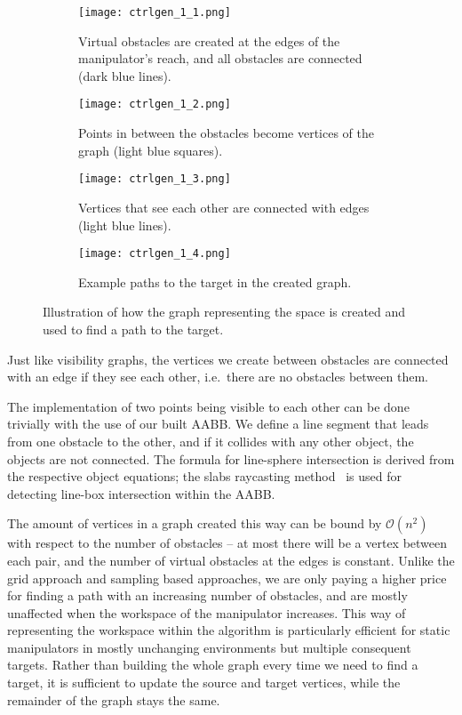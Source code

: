 \begin{figure}
    \centering
    \begin{subfigure}{.45\textwidth}
      \texttt{[image: ctrlgen\_1\_1.png]}
      \caption{Virtual obstacles are created at the edges of the manipulator's reach, and all obstacles are connected (dark blue lines).}
    \end{subfigure}
    \begin{subfigure}{0.45\textwidth}
      \texttt{[image: ctrlgen\_1\_2.png]}
      \caption{Points in between the obstacles become vertices of the graph (light blue squares).}
    \end{subfigure}

    \begin{subfigure}{.45\textwidth}
      \texttt{[image: ctrlgen\_1\_3.png]}
      \caption{Vertices that see each other are connected with edges (light blue lines).}
    \end{subfigure}
    \begin{subfigure}{0.45\textwidth}
      \texttt{[image: ctrlgen\_1\_4.png]}
      \caption{Example paths to the target in the created graph.}
    \end{subfigure}
    \caption{Illustration of how the graph representing the space is created and used to find a path to the target.}\label{fig:ctrlgen}
  \end{figure}

Just like visibility graphs, the vertices we create between obstacles are connected with an edge if they see each other, i.e.\ there are no obstacles between them.

The implementation of two points being visible to each other can be done trivially with the use of our built AABB. We define a line segment that leads from one obstacle to the other, and if it collides with any other object, the objects are not connected. The formula for line-sphere intersection is derived from the respective object equations; the slabs raycasting method~\cite{slabs} is used for detecting line-box intersection within the AABB.

The amount of vertices in a graph created this way can be bound by $\mathcal{O}(n^2)$ with respect to the number of obstacles -- at most there will be a vertex between each pair, and the number of virtual obstacles at the edges is constant. Unlike the grid approach and sampling based approaches, we are only paying a higher price for finding a path with an increasing number of obstacles, and are mostly unaffected when the workspace of the manipulator increases. This way of representing the workspace within the algorithm is particularly efficient for static manipulators in mostly unchanging environments but multiple consequent targets. Rather than building the whole graph every time we need to find a target, it is sufficient to update the source and target vertices, while the remainder of the graph stays the same.

